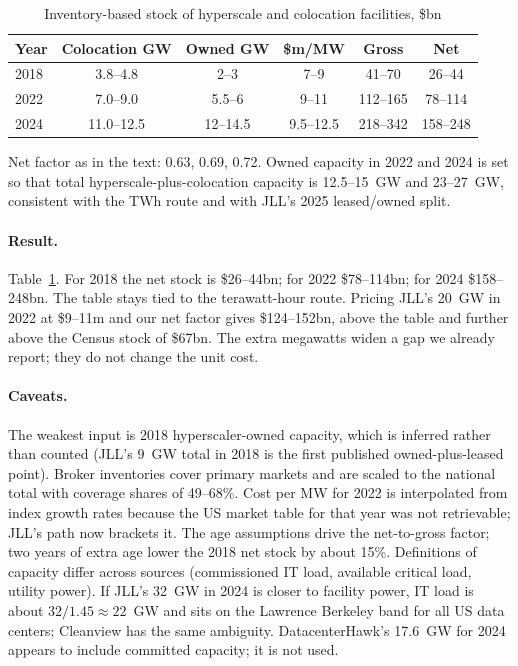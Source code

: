 \documentclass[11pt]{article}
\newcommand{\bn}{\$bn}
\begin{document}
\begin{table}[ht]
\centering
\begin{threeparttable}
\caption{Inventory-based stock of hyperscale and colocation facilities, \bn}
\label{tab:mw}
\begin{tabular}{lccccc}
\toprule
Year & Colocation GW & Owned GW & \$m/MW & Gross & Net \\
\midrule
2018 & 3.8--4.8 & 2--3 & 7--9 & 41--70 & 26--44 \\
2022 & 7.0--9.0 & 5.5--6 & 9--11 & 112--165 & 78--114 \\
2024 & 11.0--12.5 & 12--14.5 & 9.5--12.5 & 218--342 & 158--248 \\
\bottomrule
\end{tabular}
\begin{tablenotes}\footnotesize
\item Net factor as in the text: 0.63, 0.69, 0.72. Owned capacity in 2022 and 2024 is set so that total hyperscale-plus-colocation capacity is 12.5--15~GW and 23--27~GW, consistent with the TWh route and with JLL's 2025 leased/owned split.
\end{tablenotes}
\end{threeparttable}
\end{table}

\paragraph{Result.} Table~\ref{tab:mw}. For 2018 the net stock is \$26--44bn; for 2022 \$78--114bn; for 2024 \$158--248bn. The table stays tied to the terawatt-hour route. Pricing JLL's 20~GW in 2022 at \$9--11m and our net factor gives \$124--152bn, above the table and further above the Census stock of \$67bn. The extra megawatts widen a gap we already report; they do not change the unit cost.

\paragraph{Caveats.} The weakest input is 2018 hyperscaler-owned capacity, which is inferred rather than counted (JLL's 9~GW total in 2018 is the first published owned-plus-leased point). Broker inventories cover primary markets and are scaled to the national total with coverage shares of 49--68\%. Cost per MW for 2022 is interpolated from index growth rates because the US market table for that year was not retrievable; JLL's path now brackets it. The age assumptions drive the net-to-gross factor; two years of extra age lower the 2018 net stock by about 15\%. Definitions of capacity differ across sources (commissioned IT load, available critical load, utility power). If JLL's 32~GW in 2024 is closer to facility power, IT load is about $32/1.45\approx 22$~GW and sits on the Lawrence Berkeley band for all US data centers; Cleanview has the same ambiguity. DatacenterHawk's 17.6~GW for 2024 appears to include committed capacity; it is not used.
\end{document}
